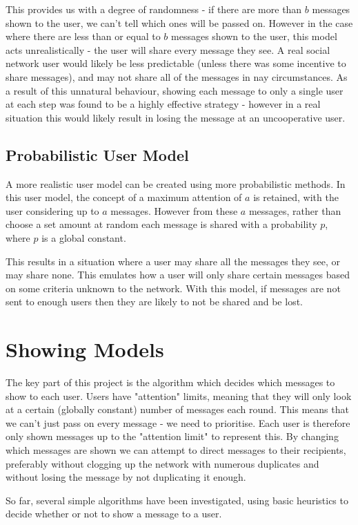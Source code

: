 \documentclass[bsc,frontabs,twoside,singlespacing,parskip,deptreport]{infthesis}     %
\begin{document}
This provides us with a degree of randomness - if there are more than $b$ messages shown to the user, we can't tell which ones will be passed on. However in the case where there are less than or equal to $b$ messages shown to the user, this model acts unrealistically - the user will share every message they see. A real social network user would likely be less predictable (unless there was some incentive to share messages), and may not share all of the messages in nay circumstances. As a result of this unnatural behaviour, showing each message to only a single user at each step was found to be a highly effective strategy - however in a real situation this would likely result in losing the message at an uncooperative user.

\subsection{Probabilistic User Model}
A more realistic user model can be created using more probabilistic methods. In this user model, the concept of a maximum attention of $a$ is retained, with the user considering up to $a$ messages. However from these $a$ messages, rather than choose a set amount at random each message is shared with a probability $p$, where $p$ is a global constant.

This results in a situation where a user may share all the messages they see, or may share none. This emulates how a user will only share certain messages based on some criteria unknown to the network. With this model, if messages are not sent to enough users then they are likely to not be shared and be lost.

\section{Showing Models}
The key part of this project is the algorithm which decides which messages to show to each user. Users have "attention" limits, meaning that they will only look at a certain (globally constant) number of messages each round. This means that we can't just pass on every message - we need to prioritise. Each user is therefore only shown messages up to the "attention limit" to represent this. By changing which messages are shown we can attempt to direct messages to their recipients, preferably without clogging up the network with numerous duplicates and without losing the message by not duplicating it enough.

So far, several simple algorithms have been investigated, using basic heuristics to decide whether or not to show a message to a user.
\end{document}
